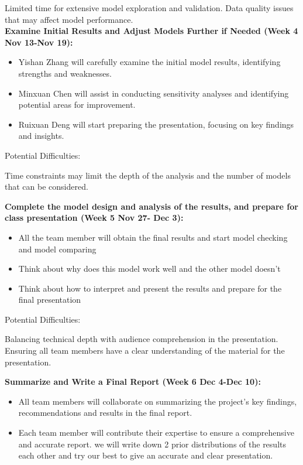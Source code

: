 \documentclass[12pt,a4paper]{article}
\begin{document}
Limited time for extensive model exploration and validation.
Data quality issues that may affect model performance.\\

\textbf{Examine Initial Results and Adjust Models Further if Needed (Week 4 Nov 13-Nov 19):}
\begin{itemize}
    \item Yishan Zhang will carefully examine the initial model results, identifying strengths and weaknesses.
    \item Minxuan Chen will assist in conducting sensitivity analyses and identifying potential areas for improvement.
    \item Ruixuan Deng will start preparing the presentation, focusing on key findings and insights.
\end{itemize}

Potential Difficulties:

Time constraints may limit the depth of the analysis and the number of models that can be considered.


\textbf{Complete the model design and analysis of the results, and prepare for class presentation (Week 5 Nov 27- Dec 3):}
\begin{itemize}
    \item All the team member will obtain the final results and start model checking and model comparing
    \item Think about why does this model work well and the other model doesn't
    \item Think about how to interpret and present the results and prepare for the final presentation
\end{itemize}

Potential Difficulties:

Balancing technical depth with audience comprehension in the presentation.
Ensuring all team members have a clear understanding of the material for the presentation.

\textbf{Summarize and Write a Final Report (Week 6 Dec 4-Dec 10):}
\begin{itemize}
    \item All team members will collaborate on summarizing the project's key findings,  recommendations and results in the final report.
    \item Each team member will contribute their expertise to ensure a comprehensive and accurate report. we will write down 2 prior distributions of the results each other and try our best to give an accurate and clear presentation.
\end{itemize}
\end{document}
